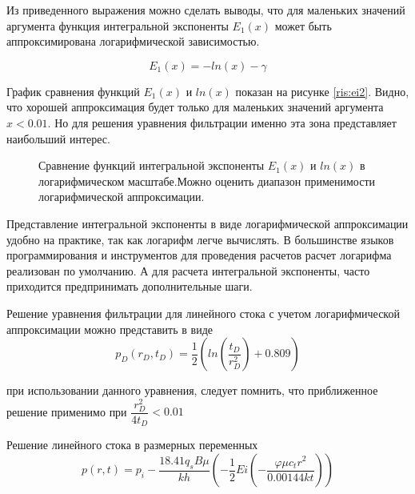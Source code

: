 Из приведенного выражения можно сделать выводы, что для маленьких значений аргумента  функция интегральной экспоненты $E_1(x)$ может быть аппроксимирована логарифмической зависимостью. 

$$E_1(x) = -ln(x) - \gamma $$

График сравнения функций $E_1(x)$ и $ln(x)$ показан на рисунке \ref{ris:ei2}. Видно, что хорошей аппроксимация будет только для маленьких значений аргумента $x < 0.01$. Но для решения уравнения фильтрации именно эта зона представляет наибольший интерес.

\begin{figure}[h!]
	\begin{center}
		\caption{Сравнение функций интегральной экспоненты $E_1(x)$ и $ln(x)$ в логарифмическом масштабе.Можно оценить диапазон применимости логарифмической аппроксимации.}
		\label{ris:ei3}
	\end{center}
\end{figure}

Представление интегральной экспоненты в виде логарифмической аппроксимации удобно на практике, так как логарифм легче вычислять. В большинстве языков программирования и инструментов для проведения расчетов расчет логарифма реализован по умолчанию. А для расчета интегральной экспоненты, часто приходится предпринимать дополнительные шаги.

Решение уравнения фильтрации для линейного стока с учетом логарифмической аппроксимации можно представить в виде 
$$ p_D(r_D,t_D) = \frac{1}{2} \left( ln \left( \dfrac{ t_D }{r_D^2}  \right) +0.809 \right) $$

при использовании данного уравнения, следует помнить, что приближенное решение применимо при $\dfrac{r_D^2}{4t_D} < 0.01$

Решение линейного стока в размерных переменных
$$ p\left(r,t\right)=p_i-\frac{18.41q_sB\mu}{kh}\left(-\frac{1}{2}Ei\left(-\frac{\varphi\mu c_tr^2}{0.00144kt}\right)\right) $$


